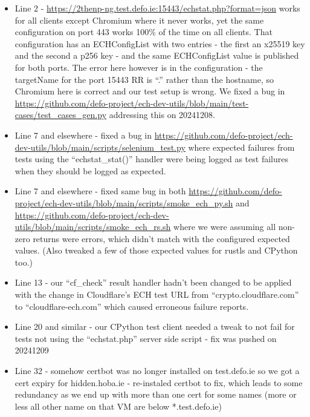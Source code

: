\begin{itemize}

\item Line 2 -
    \url{https://2thenp-ng.test.defo.ie:15443/echstat.php?format=json} works
        for all clients except Chromium where it never works, yet the same
        configuration on port 443 works 100\% of the time on all clients. That
        configuration has an ECHConfigList with two entries - the first an
        x25519 key and the second a p256 key - and the same ECHConfigList value
        is published for both ports. The error here however is in the
        configuration - the targetName for the port 15443 RR is ``.'' rather
        than the hostname, so Chromium here is correct and our test setup is
        wrong. We fixed a bug in
        \url{https://github.com/defo-project/ech-dev-utils/blob/main/test-cases/test_cases_gen.py}
        addressing this on 20241208.\\

    \item Line 7 and elsewhere - fixed a bug in
        \url{https://github.com/defo-project/ech-dev-utils/blob/main/scripts/selenium_test.py}
        where expected failures from tests using the ``echstat\_stat()''
        handler were being logged as test failures when they should be logged
        as expected.

    \item Line 7 and elsewhere - fixed same bug in both
        \url{https://github.com/defo-project/ech-dev-utils/blob/main/scripts/smoke_ech_py.sh}
        and
        \url{https://github.com/defo-project/ech-dev-utils/blob/main/scripts/smoke_ech_rs.sh}
        where we were assuming all non-zero returns were errors, which didn't match with
        the configured expected values. (Also tweaked a few of those expected values for
        rustls and CPython too.)

    \item Line 13 - our ``cf\_check'' result handler hadn't been changed to be
        applied with the change in Cloudflare's ECH test URL from
        ``crypto.cloudflare.com'' to ``cloudflare-ech.com'' which caused
        erroneous failure reports.

    \item Line 20 and similar - our CPython test client needed a tweak to not
        fail for tests not using the ``echstat.php'' server side script - fix
        was pushed on 20241209

    \item Line 32 - somehow certbot was no longer installed on test.defo.ie so
        we got a cert expiry for hidden.hoba.ie - re-instaled certbot to fix,
        which leads to some redundancy as we end up with more than one cert for
        some names (more or less all other name on that VM are below
        *.test.defo.ie)


\end{itemize}
